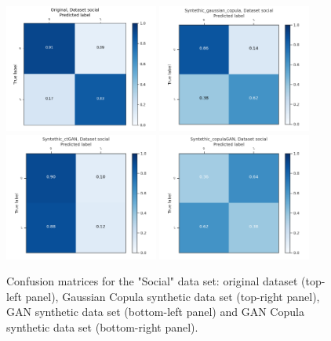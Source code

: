 \documentclass{article}
\begin{document}
\begin{figure}[h!]
	\centering
	\includegraphics[width=0.45\textwidth]{../ConfusionMatrixes/social_Original_.png}
	\includegraphics[width=0.45\textwidth]{../ConfusionMatrixes/social_Syntethic_gaussian_copula_.png}
	\includegraphics[width=0.45\textwidth]{../ConfusionMatrixes/social_Syntethic_ctGAN_.png}
	\includegraphics[width=0.45\textwidth]{../ConfusionMatrixes/social_Syntethic_copulaGAN_.png}

	\caption{Confusion matrices for the "Social" data set: original dataset (top-left panel), Gaussian Copula synthetic data set (top-right panel), GAN synthetic data set (bottom-left panel) and GAN Copula synthetic data set (bottom-right panel).  }
	\label{confusion_social}
\end{figure}
\end{document}
